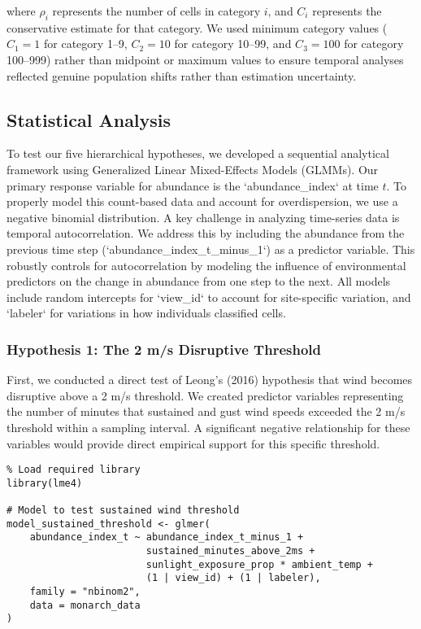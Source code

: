where $\rho_i$ represents the number of cells in category $i$, and $C_i$ represents the conservative estimate for that category. We used minimum category values ($C_1 = 1$ for category 1–9, $C_2 = 10$ for category 10–99, and $C_3 = 100$ for category 100–999) rather than midpoint or maximum values to ensure temporal analyses reflected genuine population shifts rather than estimation uncertainty.

\subsection{Statistical Analysis}
\label{sec:statistical-analysis}

To test our five hierarchical hypotheses, we developed a sequential analytical framework using Generalized Linear Mixed-Effects Models (GLMMs). Our primary response variable for abundance is the `abundance_index` at time $t$. To properly model this count-based data and account for overdispersion, we use a negative binomial distribution. A key challenge in analyzing time-series data is temporal autocorrelation. We address this by including the abundance from the previous time step (`abundance_index_t_minus_1`) as a predictor variable. This robustly controls for autocorrelation by modeling the influence of environmental predictors on the change in abundance from one step to the next. All models include random intercepts for `view_id` to account for site-specific variation, and `labeler` for variations in how individuals classified cells.

\subsubsection{Hypothesis 1: The 2 m/s Disruptive Threshold}

First, we conducted a direct test of Leong's (2016) hypothesis that wind becomes disruptive above a 2 m/s threshold. We created predictor variables representing the number of minutes that sustained and gust wind speeds exceeded the 2 m/s threshold within a sampling interval. A significant negative relationship for these variables would provide direct empirical support for this specific threshold.

\begin{verbatim}
% Load required library
library(lme4)

# Model to test sustained wind threshold
model_sustained_threshold <- glmer(
    abundance_index_t ~ abundance_index_t_minus_1 + 
                        sustained_minutes_above_2ms + 
                        sunlight_exposure_prop * ambient_temp +
                        (1 | view_id) + (1 | labeler),
    family = "nbinom2",
    data = monarch_data
)
\end{verbatim}


